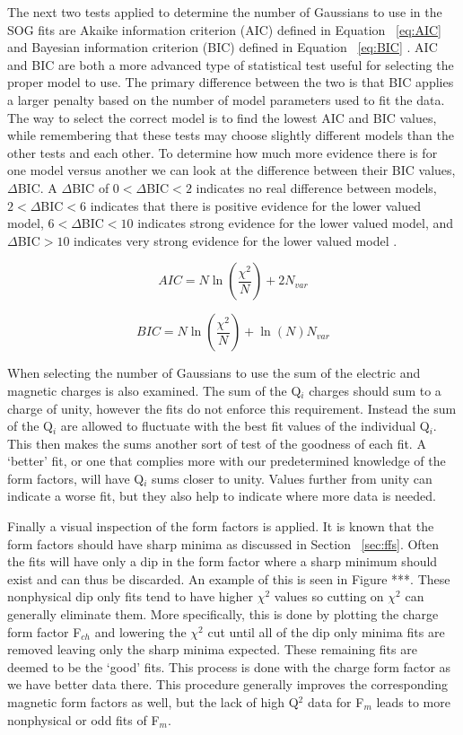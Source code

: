 The next two tests applied to determine the number of Gaussians to use in the SOG fits are Akaike information criterion (AIC) defined in Equation ~\ref{eq:AIC} \cite{Article:AIC} and Bayesian information criterion (BIC) defined in Equation ~\ref{eq:BIC} \cite{Article:BIC}. AIC and BIC are both a more advanced type of statistical test useful for selecting the proper model to use. The primary difference between the two is that BIC applies a larger penalty based on the number of model parameters used to fit the data. The way to select the correct model is to find the lowest AIC and BIC values, while remembering that these tests may choose slightly different models than the other tests and each other. To determine how much more evidence there is for one model versus another we can look at the difference between their BIC values, $\Delta$BIC. A $\Delta$BIC of $0<\Delta$BIC$<2$ indicates no real difference between models, $2<\Delta$BIC$<6$ indicates that there is positive evidence for the lower valued model, $6<\Delta$BIC$<10$ indicates strong evidence for the lower valued model, and $\Delta$BIC$>10$ indicates very strong evidence for the lower valued model \cite{Article:Delta_BIC}.

\begin{equation} \label{eq:AIC}
	AIC = N \ln\left( \frac{\chi^2}{N} \right) + 2 N_{var}
\end{equation}

\begin{equation} \label{eq:BIC}
	BIC = N \ln\left( \frac{\chi^2}{N} \right) +  \ln\left( N \right) N_{var}
\end{equation}

When selecting the number of Gaussians to use the sum of the electric and magnetic charges is also examined. The sum of the Q$_i$ charges should sum to a charge of unity, however the fits do not enforce this requirement. Instead the sum of the Q$_i$ are allowed to fluctuate with the best fit values of the individual Q$_i$. This then makes the sums another sort of test of the goodness of each fit. A `better' fit, or one that complies more with our predetermined knowledge of the form factors, will have Q$_i$ sums closer to unity. Values further from unity can indicate a worse fit, but they also help to indicate where more data is needed.

Finally a visual inspection of the form factors is applied. It is known that the form factors should have sharp minima as discussed in Section ~\ref{sec:ffs}. Often the fits will have only a dip in the form factor where a sharp minimum should exist and can thus be discarded. An example of this is seen in Figure ***. These nonphysical dip only fits tend to have higher $\chi^2$ values so cutting on $\chi^2$ can generally eliminate them. More specifically, this is done by plotting the charge form factor F$_{ch}$ and lowering the $\chi^2$ cut until all of the dip only minima fits are removed leaving only the sharp minima expected. These remaining fits are deemed to be the `good' fits. This process is done with the charge form factor as we have better data there. This procedure generally improves the corresponding magnetic form factors as well, but the lack of high Q$^2$ data for F$_m$ leads to more nonphysical or odd fits of F$_m$.


